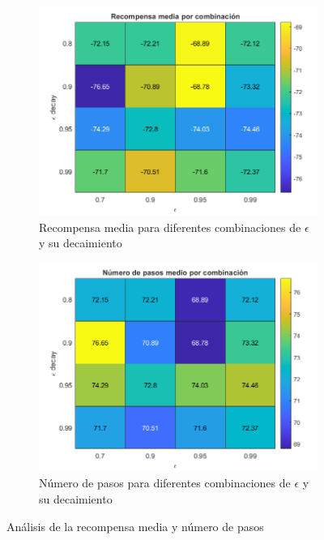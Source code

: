 \begin{figure}[H]
    \centering
    \begin{subfigure}{0.7\textwidth}
        \centering
        \includegraphics[width=\textwidth]{../../experiments/qlearning/experiment-2/results/reward.png}
        \caption{Recompensa media para diferentes combinaciones de $\epsilon$ y su decaimiento}
        \label{fig:qlearning-subfig-reward}
    \end{subfigure}
    \hfill
    \begin{subfigure}{0.7\textwidth}
        \centering
        \includegraphics[width=\textwidth]{../../experiments/qlearning/experiment-2/results/steps.png}
        \caption{Número de pasos para diferentes combinaciones de $\epsilon$ y su decaimiento}
        \label{fig:qlearning-subfig-steps}
    \end{subfigure}
    \caption{Análisis de la recompensa media y número de pasos}
    \label{fig:qlearning-reward}
\end{figure}

